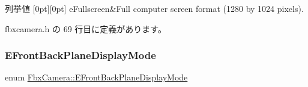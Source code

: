 \begin{DoxyEnumFields}{列挙値}
[0pt][0pt]{}\mbox{\label{class_fbx_camera_a88d68c983d21e4d6c0f281a8a30f0a06a0428f6f444084ecf37a06dae082c710b}} 
e\+Fullscreen&Full computer screen format (1280 by 1024 pixels). \\
\hline

\end{DoxyEnumFields}


 fbxcamera.\+h の 69 行目に定義があります。

\mbox{\label{class_fbx_camera_ab7b9d3e546552049a79261a444f9b44a}} 
\subsubsection{\texorpdfstring{E\+Front\+Back\+Plane\+Display\+Mode}{EFrontBackPlaneDisplayMode}}
{\footnotesize\ttfamily enum \hyperlink{class_fbx_camera_ab7b9d3e546552049a79261a444f9b44a}{Fbx\+Camera\+::\+E\+Front\+Back\+Plane\+Display\+Mode}}

